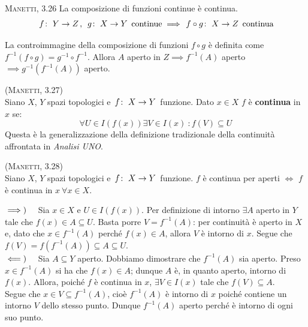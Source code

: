\begin{theorema}\textsc{Manetti, 3.26}
	La composizione di funzioni continue è continua.
	\begin{equation}
		\funz{f}{Y}{Z},\ \funz{g}{X}{Y}\text{ continue}\implies \funz{f\circ g}{X}{Z}\text{ continua}
	\end{equation}
\end{theorema}
\begin{demonstration}
	La controimmagine della composizione di funzioni $f\circ g$ è definita come $f^{-1}\left(f\circ g\right)=g^{-1}\circ f^{-1}$. Allora $A$ aperto in $Z\implies f^{-1}\left(A\right)$ aperto $\implies g^{-1}\left(f^{-1}\left(A\right)\right)$ aperto.%
\end{demonstration}
\begin{define}\textsc{(Manetti, 3.27)}\\
	Siano $X$, $Y$ spazi topologici e $\funz{f}{X}{Y}$ funzione. Dato $x\in X$ $f$ è \textbf{continua} in $x$ se:
	\begin{equation}
		\forall U\in I\left(f\left(x\right)\right)\exists V\in I\left(x\right)\ \colon f\left(V\right)\subseteq U
	\end{equation}
	Questa è la generalizzazione della definizione tradizionale della continuità affrontata in \textit{Analisi UNO}.
\end{define}
\begin{theorema}\textsc{(Manetti, 3.28)}\\
	Siano $X$, $Y$ spazi topologici e $\funz{f}{X}{Y}$ funzione. $f$ è continua per aperti $\iff$ $f$ è continua in $x\ \forall x\in X$.
\end{theorema}
\begin{demonstration}
	$\implies)\quad$ Sia $x\in X$ e $U\in I\left(f\left(x\right)\right)$. Per definizione di intorno $\exists A$ aperto in $Y$ tale che $f\left(x\right)\in A\subseteq U$.
	Basta porre $V=f^{-1}\left(A\right)$: per continuità è aperto in $X$ e, dato che $x\in f^{-1}\left(A\right)$ perché $f\left(x\right)\in A$, allora $V$ è intorno di $x$. Segue che $f\left(V\right)=f\left(f^{-1}\left(A\right)\right)\subseteq A\subseteq U$.\\
	$\impliedby)\quad$ Sia $A\subseteq Y$ aperto. Dobbiamo dimostrare che $f^{-1}\left(A\right)$ sia aperto. Preso $x\in f^{-1}\left(A\right)$ si ha che $f\left(x\right)\in A$; dunque $A$ è, in quanto aperto, intorno di $f\left(x\right)$. Allora, poiché $f$ è continua in $x$, $\exists V\in I\left(x\right)$ tale che $f\left(V\right)\subseteq A$.\\
	Segue che $x\in V\subseteq f^{-1}\left(A\right)$, cioè $f^{-1}\left(A\right)$ è intorno di $x$ poiché contiene un intorno $V$ dello stesso punto. Dunque $f^{-1}\left(A\right)$ aperto perché è intorno di ogni suo punto.
\end{demonstration}
